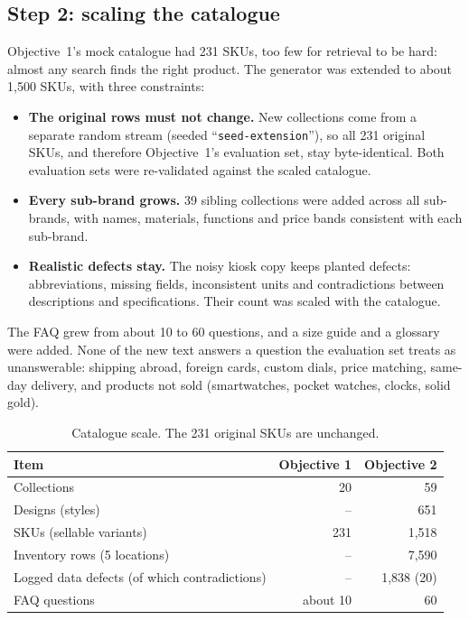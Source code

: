 \documentclass[11pt,a4paper]{article}
\begin{document}
\subsection{Step 2: scaling the catalogue}\label{sec:catalogue}
Objective~1's mock catalogue had 231 SKUs, too few for retrieval to be hard: almost any search finds the right product.
The generator was extended to about 1,500 SKUs, with three constraints:
\begin{itemize}
  \item \textbf{The original rows must not change.} New collections come from a separate random stream (seeded
        ``\texttt{seed-extension}''), so all 231 original SKUs, and therefore Objective~1's evaluation set, stay
        byte-identical. Both evaluation sets were re-validated against the scaled catalogue.
  \item \textbf{Every sub-brand grows.} 39 sibling collections were added across all sub-brands, with names, materials,
        functions and price bands consistent with each sub-brand.
  \item \textbf{Realistic defects stay.} The noisy kiosk copy keeps planted defects: abbreviations, missing fields,
        inconsistent units and contradictions between descriptions and specifications. Their count was scaled with the
        catalogue.
\end{itemize}
The FAQ grew from about 10 to 60 questions, and a size guide and a glossary were added. None of the new text answers a
question the evaluation set treats as unanswerable: shipping abroad, foreign cards, custom dials, price matching,
same-day delivery, and products not sold (smartwatches, pocket watches, clocks, solid gold).

\begin{table}[H]
\centering
\small
\begin{tabular}{l r r}
\toprule
Item & Objective 1 & Objective 2 \\
\midrule
Collections & 20 & 59 \\
Designs (styles) & -- & 651 \\
SKUs (sellable variants) & 231 & 1,518 \\
Inventory rows (5 locations) & -- & 7,590 \\
Logged data defects (of which contradictions) & -- & 1,838 (20) \\
FAQ questions & about 10 & 60 \\
\bottomrule
\end{tabular}
\caption{Catalogue scale. The 231 original SKUs are unchanged.}
\label{tab:catalogue}
\end{table}
\end{document}
